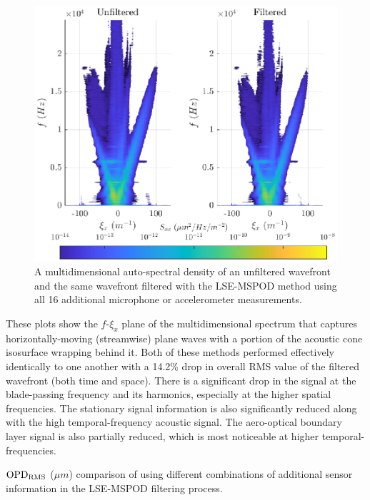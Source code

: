 \begin{figure}
  \centering
  \includegraphics{../matlab/07_multiple_sensor_filtering/lse_mspod.eps}
  \caption{A multidimensional auto-spectral density of an unfiltered wavefront and the same wavefront filtered with the LSE-MSPOD method using all 16 additional microphone or accelerometer measurements.  }
  \label{fig:07_lse_mspod}
\end{figure}
These plots show the $f$-$\xi_x$ plane of the multidimensional spectrum that captures horizontally-moving (streamwise) plane waves with a portion of the acoustic cone isosurface wrapping behind it.
Both of these methods performed effectively identically to one another with a 14.2\% drop in overall RMS value of the filtered wavefront (both time and space).
There is a significant drop in the signal at the blade-passing frequency and its harmonics, especially at the higher spatial frequencies.
The stationary signal information is also significantly reduced along with the high temporal-frequency acoustic signal.
The aero-optical boundary layer signal is also partially reduced, which is most noticeable at higher temporal-frequencies.

\begin{table}
  \centering
  \caption{$\operatorname{OPD_{RMS}}$ ($\mu m$) comparison of using different combinations of additional sensor information in the LSE-MSPOD filtering process.}
  
  \label{tab:07_lse_mspod_table}
\end{table}

